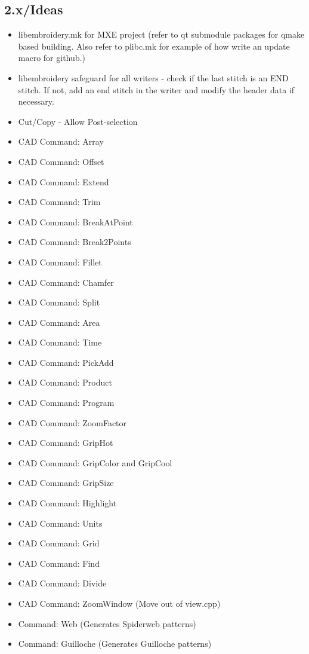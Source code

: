 \documentclass[11pt]{report}
\begin{document}
\subsection{2.x/Ideas}

\begin{itemize}
\item libembroidery.mk for MXE project (refer to qt submodule packages for qmake based building. Also refer to plibc.mk for example of how write an update macro for github.)
\item libembroidery safeguard for all writers - check if the last stitch is an END stitch. If not, add an end stitch in the writer and modify the header data if necessary.
\item Cut/Copy - Allow Post-selection
\item CAD Command: Array
\item CAD Command: Offset
\item CAD Command: Extend
\item CAD Command: Trim
\item CAD Command: BreakAtPoint
\item CAD Command: Break2Points
\item CAD Command: Fillet
\item CAD Command: Chamfer
\item CAD Command: Split
\item CAD Command: Area
\item CAD Command: Time
\item CAD Command: PickAdd
\item CAD Command: Product
\item CAD Command: Program
\item CAD Command: ZoomFactor
\item CAD Command: GripHot
\item CAD Command: GripColor and GripCool
\item CAD Command: GripSize
\item CAD Command: Highlight
\item CAD Command: Units
\item CAD Command: Grid
\item CAD Command: Find
\item CAD Command: Divide
\item CAD Command: ZoomWindow (Move out of view.cpp)
\item Command: Web (Generates Spiderweb patterns)
\item Command: Guilloche (Generates Guilloche patterns)

\end{itemize}
\end{document}
